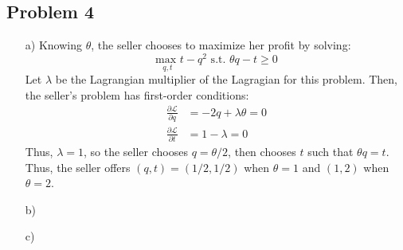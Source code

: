 \documentclass{article}
\newcommand{\usmax}[1]{\underset{#1}{\text{max }}}
\renewcommand{\L}{\mathcal{L}}
\begin{document}
\subsection*{Problem 4}

\begin{itemize}
	\item[a)] Knowing $\theta$, the seller chooses to maximize her profit by solving:
		\[
			\usmax{q,t}t-q^2\text{ s.t. }\theta q - t\geq 0
		\]
		Let $\lambda$ be the Lagrangian multiplier of the Lagragian for this problem. Then, the seller's problem has first-order conditions:
		\begin{align*}
			\frac{\partial\L}{\partial q} &= -2q + \lambda\theta = 0	\\
			\frac{\partial\L}{\partial t} &= 1 - \lambda = 0
		\end{align*}
		Thus, $\lambda=1$, so the seller chooses ${q=\theta/2}$, then chooses $t$ such that ${\theta q=t}$. Thus, the seller offers ${(q,t)=(1/2,1/2)}$ when ${\theta=1}$ and ${(1,2)}$ when ${\theta=2}$.
	
	\item[b)] 
	
	
	\item[c)]
		
		
\end{itemize}

\end{document}
